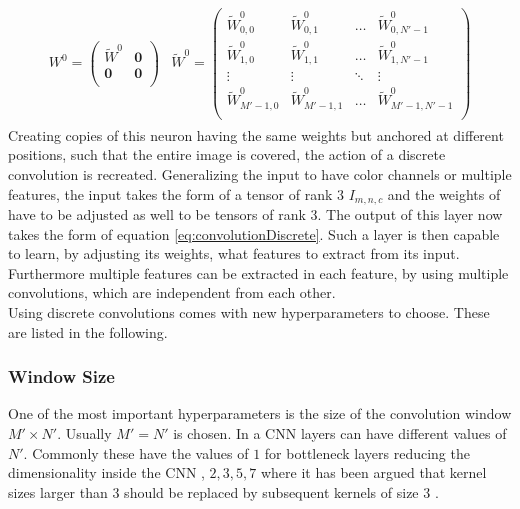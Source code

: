 \begin{align}
\begin{split}
W^0 = 
\begin{pmatrix}
\tilde{W}^0 & \boldsymbol{0} \\
\boldsymbol{0} & \boldsymbol{0} \\
\end{pmatrix}
\end{split}
\begin{split}
\tilde{W}^0 = 
\begin{pmatrix}
\tilde{W}_{0,0}^0 & \tilde{W}_{0,1}^0 & \dots & \tilde{W}_{0,N'-1}^0 \\
\tilde{W}_{1,0}^0 & \tilde{W}_{1,1}^0 & \dots & \tilde{W}_{1,N'-1}^0 \\
\vdots & \vdots & \ddots & \vdots \\
\tilde{W}_{M'-1,0}^0 & \tilde{W}_{M'-1,1}^0 & \dots & \tilde{W}_{M'-1,N'-1}^0 \\
\end{pmatrix}
\end{split}
\end{align}
Creating copies of this neuron having the same weights but anchored at different positions, such that the entire image is covered, the action of a discrete convolution is recreated. Generalizing the input to have color channels or multiple features, the input takes the form of a tensor of rank $3$ $I_{m,n,c}$ and the weights of have to be adjusted as well to be tensors of rank $3$. The output of this layer now takes the form of equation \ref{eq:convolutionDiscrete}. Such a layer is then capable to learn, by adjusting its weights, what features to extract from its input. Furthermore multiple features can be extracted in each feature, by using multiple convolutions, which are independent from each other. \\

Using discrete convolutions comes with new hyperparameters to choose. These are listed in the following.

\subsubsection{Window Size}
One of the most important hyperparameters is the size of the convolution window $M' \times N'$. Usually $M' = N'$ is chosen. In a CNN layers can have different values of $N'$. Commonly these have the values of $1$ for bottleneck layers reducing the dimensionality inside the CNN \cite{Bottleneck}, $2,3,5,7$ where it has been argued that kernel sizes larger than $3$ should be replaced by subsequent kernels of size $3$ \cite{InceptionV3}. 
 
